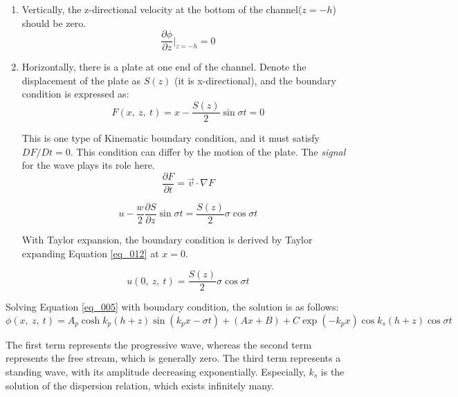 \begin{enumerate}
    \item Vertically, the z-directional velocity at the bottom of the channel($z=-h$) should be zero.
    \begin{equation}
        \frac{\partial \phi}{\partial z}|_{z=-h} = 0\label{eq_009}
    \end{equation}

    \item Horizontally, there is a plate at one end of the channel. Denote the displacement of the plate as $S(z)$ (it is x-directional), and the boundary condition is expressed as:
    \begin{equation}
        F(x, ~z, ~t) = x - \frac{S(z)}{2} \sin{\sigma t} = 0\label{eq_010}
    \end{equation}

    This is one type of Kinematic boundary condition, and it must satisfy ${DF/Dt} = 0$. This condition can differ by the motion of the plate. The \textit{signal} for the wave plays its role here.
    \begin{equation}
        \frac{\partial F}{\partial t} = {\vec{v} \cdot \nabla F}\label{eq_011}
    \end{equation}

    \begin{equation}
        u - \frac{w}{2}\frac{\partial S}{\partial z}\sin{\sigma t} = \frac{S(z)}{2} \sigma \cos{\sigma t}\label{eq_012}
    \end{equation}

    With Taylor expansion, the boundary condition is derived by Taylor expanding Equation \ref{eq_012} at $x=0$.
    
    \begin{equation}
        u(0, ~z, ~t) = \frac{S(z)}{2} \sigma \cos{\sigma t} \label{eq_013}
    \end{equation}
    
\end{enumerate}

Solving Equation \ref{eq_005} with boundary condition, the solution is as follows:
\begin{equation}
    \phi(x, ~z, ~t) = A_p \cosh{k_p (h+z)} \sin{(k_p x - \sigma t)} + (Ax + B) + C \exp(-k_p x) \cos{k_s (h+z)} \cos{\sigma t}\label{eq_014}
\end{equation}

The first term represents the progressive wave, whereas the second term represents the free stream, which is generally zero. The third term represents a standing wave, with its amplitude decreasing exponentially. Especially, $k_s$ is the solution of the dispersion relation, which exists infinitely many.


